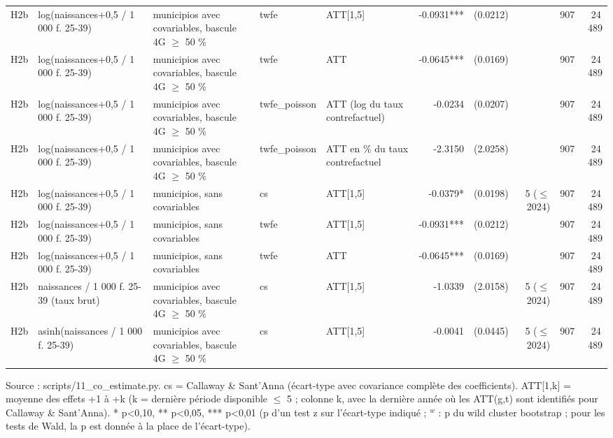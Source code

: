 \begin{table}
\begin{threeparttable}
\begin{tabular}{lp{3.8cm}p{6.6cm}lp{3.5cm}rrrrr}
H2b & log(naissances+0,5 / 1 000 f. 25-39) & municipios avec covariables, bascule 4G $\geq$ 50 \% & twfe & ATT[1,5] & -0.0931*** & (0.0212) &  & 907 & 24\,489 \\
H2b & log(naissances+0,5 / 1 000 f. 25-39) & municipios avec covariables, bascule 4G $\geq$ 50 \% & twfe & ATT & -0.0645*** & (0.0169) &  & 907 & 24\,489 \\
H2b & log(naissances+0,5 / 1 000 f. 25-39) & municipios avec covariables, bascule 4G $\geq$ 50 \% & twfe\_poisson & ATT (log du taux contrefactuel) & -0.0234 & (0.0207) &  & 907 & 24\,489 \\
H2b & log(naissances+0,5 / 1 000 f. 25-39) & municipios avec covariables, bascule 4G $\geq$ 50 \% & twfe\_poisson & ATT en \% du taux contrefactuel & -2.3150 & (2.0258) &  & 907 & 24\,489 \\
H2b & log(naissances+0,5 / 1 000 f. 25-39) & municipios, sans covariables & cs & ATT[1,5] & -0.0379* & (0.0198) & 5 ($\leq$ 2024) & 907 & 24\,489 \\
H2b & log(naissances+0,5 / 1 000 f. 25-39) & municipios, sans covariables & twfe & ATT[1,5] & -0.0931*** & (0.0212) &  & 907 & 24\,489 \\
H2b & log(naissances+0,5 / 1 000 f. 25-39) & municipios, sans covariables & twfe & ATT & -0.0645*** & (0.0169) &  & 907 & 24\,489 \\
H2b & naissances / 1 000 f. 25-39 (taux brut) & municipios avec covariables, bascule 4G $\geq$ 50 \% & cs & ATT[1,5] & -1.0339 & (2.0158) & 5 ($\leq$ 2024) & 907 & 24\,489 \\
H2b & asinh(naissances / 1 000 f. 25-39) & municipios avec covariables, bascule 4G $\geq$ 50 \% & cs & ATT[1,5] & -0.0041 & (0.0445) & 5 ($\leq$ 2024) & 907 & 24\,489 \\
\bottomrule
\end{tabular}
\begin{tablenotes}\footnotesize
\item Source : scripts/11\_co\_estimate.py. cs = Callaway \& Sant'Anna (écart-type avec covariance complète des coefficients). ATT[1,k] = moyenne des effets +1 à +k (k = dernière période disponible $\leq$ 5 ; colonne k, avec la dernière année où les ATT(g,t) sont identifiés pour Callaway \& Sant'Anna). * p<0,10, ** p<0,05, *** p<0,01 (p d'un test z sur l'écart-type indiqué ; $^{w}$ : p du wild cluster bootstrap ; pour les tests de Wald, la p est donnée à la place de l'écart-type).
\end{tablenotes}
\end{threeparttable}
\end{table}
